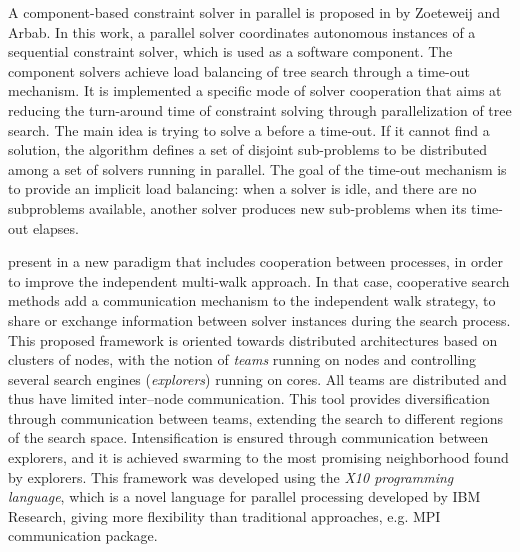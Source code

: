 A component-based constraint solver in parallel is proposed in \cite{Zoeteweij} by Zoeteweij and Arbab. In this work, a parallel solver coordinates autonomous instances of a sequential constraint solver, which is used as a software component. The component solvers achieve load balancing of tree search through a time-out mechanism. It is implemented a specific mode of solver cooperation that aims at reducing the turn-around time of constraint solving through parallelization of tree search. The main idea is trying to solve a \csp{} before a time-out. If it cannot find a solution, the algorithm defines a set of disjoint sub-problems to be distributed among a set of solvers running in parallel. The goal of the time-out mechanism is to provide an implicit load balancing: when a solver is idle, and there are no subproblems available, another solver produces new sub-problems when its time-out elapses.


 present in \cite{Munera} a new paradigm that includes cooperation between processes, in order to improve the independent multi-walk approach. In that case, cooperative search methods add a communication mechanism to the independent walk strategy, to share or exchange information between solver instances during the search process. This proposed framework is oriented towards distributed architectures based on clusters of nodes, with the notion of {\it teams} running on nodes and controlling several search engines ({\it explorers}) running on cores. All teams are distributed and thus have limited inter--node communication. This tool provides diversification through communication between teams, extending the search to different regions of the search space. Intensification is ensured through communication between explorers, and it is achieved swarming to the most promising neighborhood found by explorers. %
This framework was developed using the {\it X10 programming language}, which is a novel language for parallel processing developed by IBM Research, giving more flexibility than traditional approaches, e.g. MPI communication package.


